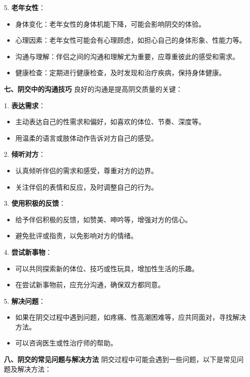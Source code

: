 \documentclass[12pt,UTF8]{ctexbook}
\begin{document}
5. \textbf{老年女性}：
\begin{itemize}
	\item 身体变化：老年女性的身体机能下降，可能会影响阴交的体验。
	\item 心理因素：老年女性可能会有心理顾虑，如担心自己的身体形象、性能力等。
	\item 沟通与理解：伴侣之间的沟通和理解尤为重要，应尊重彼此的感受和需求。
	\item 健康检查：定期进行健康检查，及时发现和治疗疾病，保持身体健康。
\end{itemize}

\textbf{七、阴交中的沟通技巧}
良好的沟通是提高阴交质量的关键：

1. \textbf{表达需求}：
\begin{itemize}
	\item 主动表达自己的性需求和偏好，如喜欢的体位、节奏、深度等。
	\item 用温柔的语言或肢体动作告诉对方自己的感受。
\end{itemize}

2. \textbf{倾听对方}：
\begin{itemize}
	\item 认真倾听伴侣的需求和感受，尊重对方的边界。
	\item 关注伴侣的表情和反应，及时调整自己的行为。
\end{itemize}

3. \textbf{使用积极的反馈}：
\begin{itemize}
	\item 给予伴侣积极的反馈，如赞美、呻吟等，增强对方的信心。
	\item 避免批评或指责，以免影响对方的情绪。
\end{itemize}

4. \textbf{尝试新事物}：
\begin{itemize}
	\item 可以共同探索新的体位、技巧或性玩具，增加性生活的乐趣。
	\item 在尝试新事物前，应充分沟通，确保双方都同意。
\end{itemize}

5. \textbf{解决问题}：
\begin{itemize}
	\item 如果在阴交过程中遇到问题，如疼痛、性高潮困难等，应共同面对，寻找解决方法。
	\item 可以咨询医生或性治疗师的帮助。
\end{itemize}

\textbf{八、阴交的常见问题与解决方法}
阴交过程中可能会遇到一些问题，以下是常见问题及解决方法：
\end{document}
